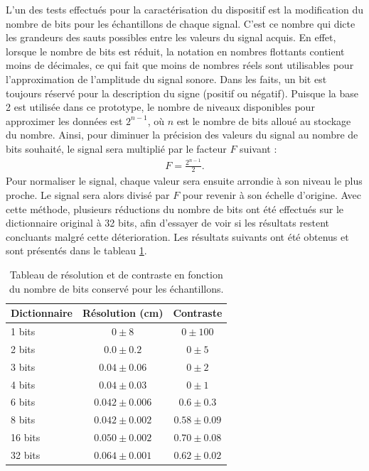 ﻿\documentclass[11pt,letterpaper]{article}
\begin{document}
L'un des tests effectués pour la caractérisation du dispositif est la modification du nombre de 
bits pour les échantillons de chaque signal.
C'est ce nombre qui dicte les grandeurs des sauts possibles entre les valeurs du signal acquis. 
En effet, lorsque le nombre de bits est réduit, la notation en nombres flottants contient moins de décimales,
ce qui fait que moins de nombres réels sont utilisables pour l'approximation de l'amplitude du signal sonore. 
Dans les faits, un bit est toujours réservé pour la description du signe (positif ou négatif).
Puisque la base 2 est utilisée dans ce prototype, le nombre de niveaux disponibles pour approximer
les données est $2^{n -1}$, où $n$ est le nombre de bits alloué au stockage du nombre.
Ainsi, pour diminuer la précision des valeurs du signal au nombre de bits souhaité,
le signal sera multiplié par le facteur $F$ suivant : 
\begin{align}
F=\frac{ 2^{n -1}}{2}\text{.} 
\end{align}
Pour normaliser le signal, chaque
valeur sera ensuite arrondie à son niveau le plus proche. Le signal sera alors divisé par
$F$ 
pour revenir à son échelle d'origine. Avec cette méthode, plusieurs réductions du nombre de bits ont été effectués
sur le dictionnaire original à 32 bits, afin d'essayer de voir si les résultats restent concluants malgré cette
déterioration. Les résultats suivants ont été obtenus et sont présentés dans le tableau \ref{nb_bit_tab}.
\begin{table}[H]
    \centering
    \begin{tabular}{l c c}
    \hline
    Dictionnaire & Résolution (cm) & Contraste  \\ \hline
    1 bits & $0 \pm 8$ & $0 \pm 100$ \\
    2 bits & $0.0 \pm 0.2$ & $0 \pm 5$ \\
    3 bits & $0.04 \pm 0.06$ & $0 \pm 2$ \\
    4 bits & $0.04 \pm 0.03$ & $0 \pm 1$ \\
    6 bits & $0.042 \pm 0.006$ & $0.6 \pm 0.3$ \\
    8 bits & $0.042 \pm 0.002$ & $0.58 \pm 0.09$ \\
    16 bits & $0.050 \pm 0.002$ & $0.70 \pm 0.08$ \\
    32 bits & $0.064 \pm 0.001$ & $0.62 \pm 0.02$ \\
    \hline
    \end{tabular}
    \caption{Tableau de résolution et de contraste en fonction du nombre de bits conservé pour les échantillons.}
    \label{nb_bit_tab}
  \end{table}
  
\end{document}
